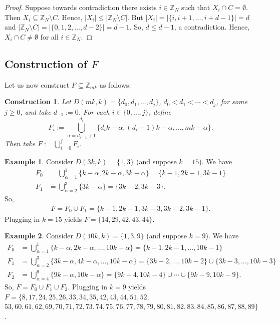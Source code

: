 \documentclass{article}
\newtheorem{construction}[theorem]{Construction}
\theoremstyle{definition}
\newtheorem*{example}{Example}
\theoremstyle{remark}
\begin{document}
\begin{proof}
    Suppose towards contradiction there exists $i \in \mathbb{Z}_N$ such that $X_i \cap C = \emptyset$. Then $X_i \subseteq \mathbb{Z}_{N} \setminus C$. Hence, $|X_i| \leq |\mathbb{Z}_{N} \setminus C|$. But $|X_i| = |\{i,i+1,\ldots,i+d-1\}| =d$ and $|\mathbb{Z}_N \setminus C| = |\{0,1,2,\ldots,d-2\}| = d-1$. So, $d \leq d-1$, a contradiction. Hence, $X_i \cap C \neq \emptyset$ for all $i \in \mathbb{Z}_N$.
\end{proof}

\subsection{Construction of $F$}

Let us now construct $F \subseteq \mathbb{Z}_{mk}$ as follows:

\begin{construction}
\label{cons:3.3}
Let $D(mk,k) = \{d_0,d_1,\ldots,d_{j}\}$, $d_0 < d_1 < \cdots < d_{j}$, for some $j \geq 0$, and take $d_{-1} := 0$. For each $i \in \{0,\ldots,j\}$, define \begin{equation*}
    F_{i} := \bigcup_{\alpha = d_{i-1}+1}^{d_i}\{d_{i}k-\alpha,(d_{i}+1)k-\alpha,\ldots,mk-\alpha\}.
\end{equation*} Then take $F := \bigcup_{i=0}^{j}F_{i}$.
    
\end{construction}

\begin{example}
    Consider $D(3k,k) = \{1,3\}$ (and suppose $k=15$). We have \begin{align*}
        F_{0} &= \bigcup_{\alpha=1}^{1}\{k-\alpha,2k-\alpha,3k-\alpha\} = \{k-1,2k-1,3k-1\} \\
        F_{1} &= \bigcup_{\alpha=2}^{3}\{3k-\alpha\} = \{3k-2,3k-3\}.
    \end{align*} So, \begin{align*}
        F = F_{0} \cup F_{1} = \{k-1,2k-1,3k-3,3k-2,3k-1\}.
    \end{align*} Plugging in $k = 15$ yields $F = \{14,29,42,43,44\}$.
\end{example}

\begin{example}
    Consider $D(10k,k) = \{1,3,9\}$ (and suppose $k=9$). We have \begin{align*}
        F_{0} &= \bigcup_{\alpha=1}^{1}\{k-\alpha,2k-\alpha,\ldots,10k-\alpha\} = \{k-1,2k-1,\ldots,10k-1\} \\
        F_{1} &= \bigcup_{\alpha=2}^{3}\{3k-\alpha,4k-\alpha,\ldots,10k-\alpha\} = \{3k-2,\ldots,10k-2\}\cup \{3k-3,\ldots,10k-3\} \\
        F_{2} &= \bigcup_{\alpha=4}^{9}\{9k-\alpha,10k-\alpha\} = \{9k-4,10k-4\} \cup \cdots \cup \{9k-9,10k-9\}.
    \end{align*} So, $F = F_{0} \cup F_{1} \cup F_{2}$. Plugging in $k=9$ yields $F = \{8,17,24,25,26,33,34,35,42,43,44,51,52,$ \\ $53,60,61,62,69,70,71,72,73,74,75,76,77,78, 79,80,81,82,83,84,85,86,87,88,89\}$.
\end{example}
\end{document}
